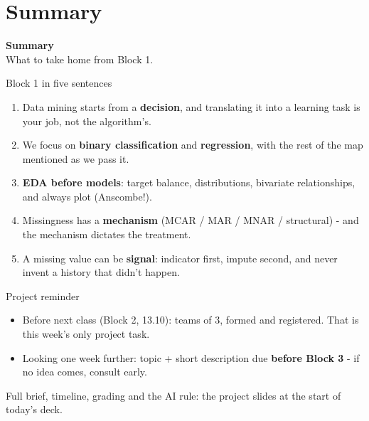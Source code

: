\documentclass[10pt,aspectratio=169]{beamer}
\begin{document}
\section{Summary}

\begin{frame}[plain]
  \begin{center}
    \vspace{1.5cm}
    {\LARGE\textbf{Summary}}\\[0.6cm]
    {\normalsize What to take home from Block 1.}
  \end{center}
\end{frame}

\begin{frame}{Block 1 in five sentences}
  \begin{enumerate}
    \item Data mining starts from a \textbf{decision}, and translating it
          into a learning task is your job, not the algorithm's.
    \item We focus on \textbf{binary classification} and
          \textbf{regression}, with the rest of the map mentioned as we pass it.
    \item \textbf{EDA before models}: target balance, distributions,
          bivariate relationships, and always plot (Anscombe!).
    \item Missingness has a \textbf{mechanism} (MCAR / MAR / MNAR /
          structural) - and the mechanism dictates the treatment.
    \item A missing value can be \textbf{signal}: indicator first, impute
          second, and never invent a history that didn't happen.
  \end{enumerate}
\end{frame}

\begin{frame}{Project reminder}
  \begin{itemize}
    \item \alert{Before next class (Block 2, 13.10): teams of 3, formed and
          registered.} That is this week's only project task.
    \item Looking one week further: topic + short description due
          \textbf{before Block 3} - if no idea comes, consult early.
  \end{itemize}
  \vspace{0.5em}
  \begin{center}\small
    Full brief, timeline, grading and the AI rule: the project slides at
    the start of today's deck.
  \end{center}
\end{frame}
\end{document}
